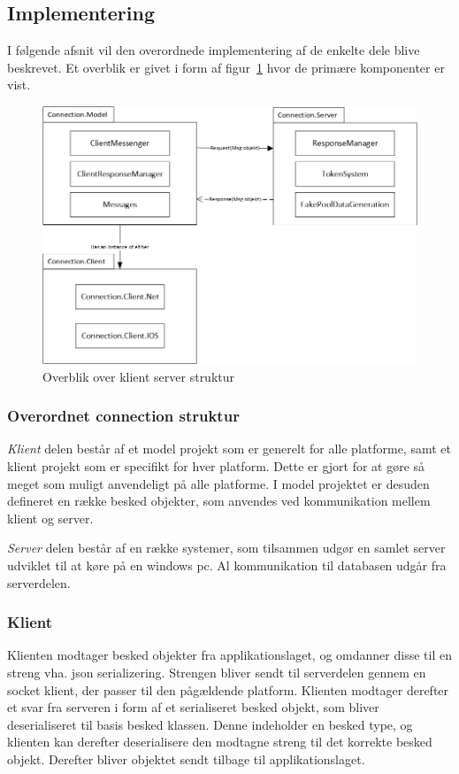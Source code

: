 \subsection{Implementering}
I følgende afsnit vil den overordnede implementering af de enkelte dele blive beskrevet. Et overblik er givet i form af figur~\ref{fig:klientserver} hvor de primære komponenter er vist.

\begin{figure}
	\centering
	\includegraphics[width=0.7\linewidth]{figs/design/klientserver.PNG}
	\caption{Overblik over klient server struktur}
	\label{fig:klientserver}
\end{figure}

\subsubsection{Overordnet connection struktur}
\textit{Klient} delen består af et model projekt som er generelt for alle platforme, samt et klient projekt som er specifikt for hver platform. Dette er gjort for at gøre så meget som muligt anvendeligt på alle platforme. I model projektet er desuden defineret en række besked objekter, som anvendes ved kommunikation mellem klient og server.

\textit{Server} delen består af en række systemer, som tilsammen udgør en samlet server udviklet til at køre på en windows pc. Al kommunikation til databasen udgår fra serverdelen.

\subsubsection{Klient}
Klienten modtager besked objekter fra applikationslaget, og omdanner disse til en streng vha. json serializering. Strengen bliver sendt til serverdelen gennem en socket klient, der passer til den pågældende platform.
Klienten modtager derefter et svar fra serveren i form af et serialiseret besked objekt, som bliver deserialiseret til basis besked klassen. Denne indeholder en besked type, og klienten kan derefter deserialisere den modtagne streng til det korrekte besked objekt. Derefter bliver objektet sendt tilbage til applikationslaget. 

